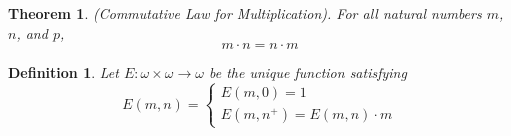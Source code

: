 \documentclass{article}
\newtheorem{mythm}{Theorem}
\newtheorem{mydef}{Definition}
\begin{document}
\begin{mythm}
	(Commutative Law for Multiplication). For all natural numbers $m$, $n$, and $p$,
	\begin{equation*}
		m \cdot n = n \cdot m
	\end{equation*}
\end{mythm}

\begin{mydef}
	Let $E \colon \omega \times \omega \to \omega$ be the unique function satisfying
	\[
	E(m, n) =
	\begin{cases}
		E(m, 0) = 1 \\
		E(m, n^+) = E(m, n) \cdot m
	\end{cases}
	\]
\end{mydef}
\end{document}
